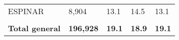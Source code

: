 \begin{tabular}{lllll}
	\cellcolor[HTML]{FF5050}ESPINAR                                & 8,904                                                                 & 13.1                                                                             & 14.5                                                                        & 13.1                                                                                \\
	&                                                                       &                                                                                  &                                                                             &                                                                                     \\
	\rowcolor[HTML]{DDEBF7} 
	\textbf{Total   general}                                       & \textbf{196,928}                                                      & \textbf{19.1}                                                                    & \textbf{18.9}                                                               & \textbf{19.1}                                                                      
\end{tabular}